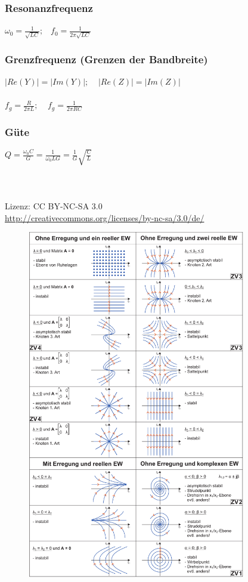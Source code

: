 \documentclass[a4paper,twocolumn,10pt]{article}
\begin{document}
\subsubsection*{Resonanzfrequenz}
$\omega_0 =\frac{1}{\sqrt{LC}};\;\;\;f_0=\frac{1}{2\pi \sqrt{LC}}$
\subsubsection*{Grenzfrequenz (Grenzen der Bandbreite)}
$|Re(Y)|=|Im(Y)|;\;\;\;\;|Re(Z)|=|Im(Z)|$\\\\
$f_g=\frac{R}{2\pi L};\;\;\;\;f_g=\frac{1}{2\pi RC}$
\subsubsection*{Güte}
$Q=\frac{\omega_0 C}{G}=\frac{1}{\omega_0 LG}=\frac{1}{G}\sqrt{\frac{C}{L}}$
\\\\\\\\
Lizenz: CC BY-NC-SA 3.0\\
\url{http://creativecommons.org/licenses/by-nc-sa/3.0/de/}
\newpage
\begin{figure}
\begin{center}
\includegraphics[width=0.85\textwidth]{Grafiken/Phasenportraits}
\end{center}
\end{figure}
\end{document}
